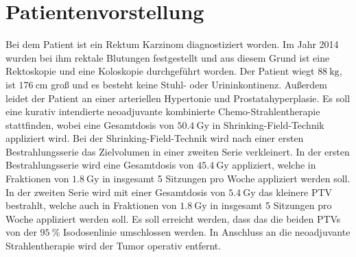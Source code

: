 \section{Patientenvorstellung}
\label{sec:Durchführung}
Bei dem Patient ist ein Rektum Karzinom diagnostiziert worden.
Im Jahr 2014 wurden bei ihm rektale Blutungen festgestellt und aus diesem Grund ist eine
Rektoskopie und eine Koloskopie durchgeführt worden.
Der Patient wiegt $\SI{88}{\kilogram}$, ist $\SI{176}{\centi\meter}$ groß und es besteht keine Stuhl- oder Urininkontinenz.
Außerdem leidet der Patient an einer arteriellen Hypertonie und Prostatahyperplasie.
Es soll eine kurativ intendierte neoadjuvante kombinierte Chemo-Strahlentherapie stattfinden,
wobei eine Gesamtdosis von $\SI{50,4}{\gray}$ in
Shrinking-Field-Technik appliziert wird.
Bei der Shrinking-Field-Technik wird nach einer ersten Bestrahlungsserie das Zielvolumen in einer zweiten Serie verkleinert.
In der ersten Bestrahlungsserie wird eine Gesamtdosis von $\SI{45,4}{\gray}$ appliziert,
welche in Fraktionen von $\SI{1,8}{\gray}$ in insgesamt 5 Sitzungen pro Woche appliziert werden soll.
In der zweiten Serie wird mit einer Gesamtdosis von $\SI{5,4}{\gray}$ das kleinere PTV bestrahlt,
welche auch in Fraktionen von $\SI{1,8}{\gray}$ in insgesamt 5 Sitzungen pro Woche appliziert werden soll.
Es soll erreicht werden, dass das die beiden PTVs von der $\SI{95}{\percent}$ Isodosenlinie umschlossen werden.
In Anschluss an die neoadjuvante Strahlentherapie wird der Tumor operativ entfernt.
